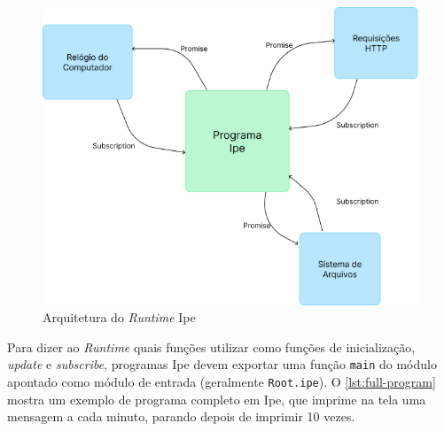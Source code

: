 \begin{figure}[htb]
    \caption{Arquitetura do \textit{Runtime} Ipe}
    \label{fig:runtime}
    \begin{center}
        \includegraphics[scale=0.65]{pictures/runtime.png}
    \end{center}
\end{figure}

Para dizer ao \textit{Runtime} quais funções utilizar como funções de inicialização,
\textit{update} e \textit{subscribe}, programas Ipe devem exportar uma função \texttt{main} do módulo
apontado como módulo de entrada (geralmente \texttt{Root.ipe}). O \autoref{lst:full-program} mostra
um exemplo de programa completo em Ipe, que imprime na tela uma mensagem a cada minuto, parando depois
de imprimir 10 vezes.

